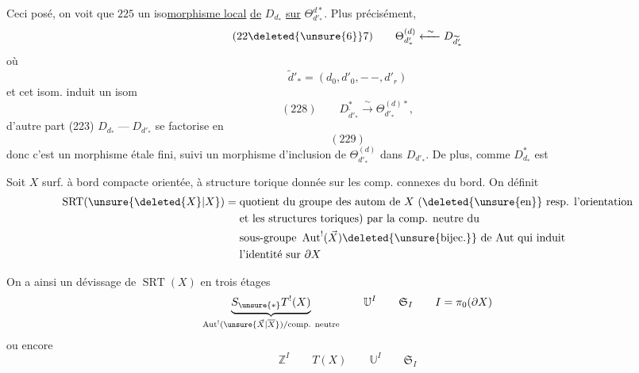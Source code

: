 Ceci posé, on voit que $225$ 
un  iso\uline{morphisme local}
\uline{de} $D_{d_*}$ \uline{sur}  $\Theta_{d'_*}^{d*}$. Plus
précisément, 
 \deleted{:}
\[
(22\deleted{\unsure{6}}7)\qquad
\Theta_{d'_*}^{(d)}\xleftarrow{\ \sim\ }D_{\widetilde d'_*}
\]
où 
\[
\widetilde d'_*=(d_0,d'_0,-\,-,d'_r)
\]
et cet isom. induit un isom
\[
(228)\qquad
D_{\widetilde d'_*}^{*}\xrightarrow{\ \sim\ }\Theta_{d'_*}^{(d)*},
\]
d'autre part (223) $D_{d_*}\mathrel{\text{---}}D_{d'_*}$ se
factorise en
\[
(229)
\]
donc c'est un morphisme étale fini,
suivi  un morphisme d'inclusion de
$\Theta_{d'_*}^{(d)}$ dans $D_{d'_*}$. De plus, comme $D_{d_*}^{*}$ est



Soit $X$ surf. à bord compacte orientée, à structure torique
donnée sur les comp. connexes du bord.
On définit
\[
\begin{aligned}
\operatorname{SRT}(\unsure{\deleted{X}|X})={}&
\text{quotient du groupe des }\text{autom de }X
\text{ (}\text{\deleted{\unsure{en}} resp. }\text{l'orientation}\\
&\text{et les structures toriques) }\text{par la comp. neutre du}\\
&\text{sous-groupe }\operatorname{Aut}^!(\vec X)
\deleted{\unsure{\mathrm{bijec.}}}
\text{ de Aut }\text{qui induit}\\
&\text{l'identité sur }\partial X
\end{aligned}
\]

On a ainsi un dévissage de $\operatorname{SRT}(X)$ en trois étages
\[
\underbrace{S_{\unsure{*}}T^!(X)}_{
\operatorname{Aut}^!(\unsure{\vec X|\overline X})/\text{comp. neutre}}
\qquad\mathbb U^I\qquad\mathfrak S_I
\qquad I=\pi_0(\partial X)
\]
ou encore
\[
\mathbb Z^I\qquad T(X)\qquad\mathbb U^I\qquad\mathfrak S_I
\]

